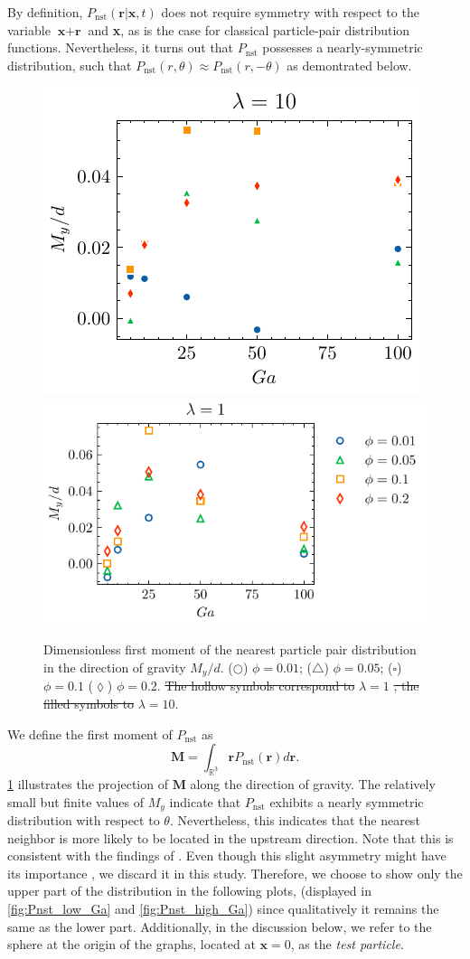 \documentclass[11pt]{My_preprint}
\providecommand{\DIFadd}[1]{{\protect\color{blue}\uwave{#1}}} %
\providecommand{\DIFdel}[1]{{\protect\color{red}\sout{#1}}}                      %
\providecommand{\DIFaddFL}[1]{\DIFadd{#1}} %
\providecommand{\DIFdelFL}[1]{\DIFdel{#1}} %
\providecommand{\DIFaddbeginFL}{} %
\providecommand{\DIFaddendFL}{} %
\providecommand{\DIFdelbeginFL}{} %
\providecommand{\DIFdelendFL}{} %
\begin{document}
By definition, $P_\text{nst}(\textbf{r}|\textbf{x},t)$ does not require symmetry with respect to the variable $\textbf{x}+\textbf{r}$ and \textbf{x}, as is the case for classical particle-pair distribution functions. 
Nevertheless, it turns out that $P_\text{nst}$ possesses a nearly-symmetric distribution, such that  $P_\text{nst}(r,\theta)\approx P_\text{nst}(r,- \theta)$ as demontrated below.
\begin{figure}[h!]
    \centering
    \DIFdelbeginFL %
\DIFdelendFL \DIFaddbeginFL \includegraphics[height = 0.3\textwidth]{image/HOMOGENEOUS_NEW/PA/Ry_l_10.pdf}
    \includegraphics[height = 0.3\textwidth]{image/HOMOGENEOUS_NEW/PA/Ry_l_1.pdf}
    \DIFaddendFL \caption{ Dimensionless first moment of the nearest particle pair distribution in the direction of gravity $M_y/d$. 
    ($\pmb\bigcirc$) $\phi = 0.01$; ($\pmb\triangle$) $ \phi = 0.05$; ($\pmb\square$) $\phi = 0.1$ ($\pmb\lozenge$) $\phi = 0.2$.
    \DIFdelbeginFL \DIFdelFL{The hollow symbols correspond to }\DIFdelendFL \DIFaddbeginFL \DIFaddFL{(right)  }\DIFaddendFL $\lambda  = 1$
    \DIFdelbeginFL \DIFdelFL{, the filled symbols to }\DIFdelendFL \DIFaddbeginFL \DIFaddFL{(left)  }\DIFaddendFL $\lambda  = 10$.
}
    \label{fig:ap:RY}
\end{figure}
We define the first moment of $P_\text{nst}$ as
\begin{equation}
 \textbf{M} = \int_{\mathbb{R}^3} \textbf{r} P_\text{nst}(\textbf{r}) d\textbf{r}.
\end{equation}
\ref{fig:ap:RY} illustrates the projection of $\textbf{M}$ along the direction of gravity. 
The relatively small but finite values of $M_y$ indicate that $P_\text{nst}$ exhibits a nearly symmetric distribution with respect to $\theta$.
Nevertheless, this indicates that the nearest neighbor is more likely to be located in the upstream direction. 
Note that this is consistent with the findings of \citet{zhang2023evolution}.
Even though this slight asymmetry might have its importance \cite{zhang2023evolution}, we discard it in this study. 
Therefore, we choose to show only the upper part of the distribution in the following plots, (displayed in \ref{fig:Pnst_low_Ga} and \ref{fig:Pnst_high_Ga}) since qualitatively it remains the same as the lower part.  
Additionally, in the discussion below, we refer to the sphere at the origin of the graphs, located at $\textbf{x}=0$, as the \textit{test particle}.
\end{document}
